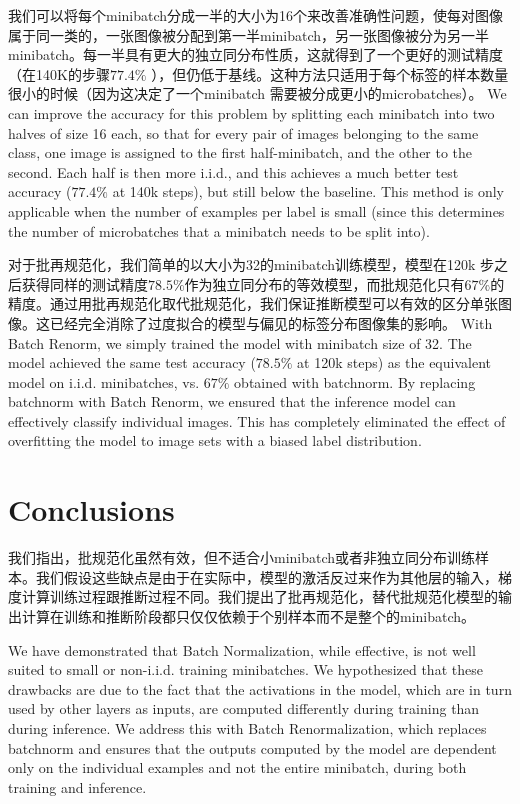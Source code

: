 我们可以将每个minibatch分成一半的大小为16个来改善准确性问题，使每对图像属于同一类的，一张图像被分配到第一半minibatch，另一张图像被分为另一半minibatch。每一半具有更大的独立同分布性质，这就得到了一个更好的测试精度（在140K的步骤$77.4\%$ ），但仍低于基线。这种方法只适用于每个标签的样本数量很小的时候（因为这决定了一个minibatch 需要被分成更小的microbatches）。
We can improve the accuracy for this problem by splitting each minibatch into two halves of size 16 each, so that for every pair of images belonging to the same class, one image is assigned to the first half-minibatch, and the other to the second. Each half is then more i.i.d., and this achieves a much better test accuracy ($77.4\%$ at 140k steps), but still below the baseline. This method is only applicable when the number of examples per label is small (since this determines the number of microbatches that a minibatch needs to be split into).

对于批再规范化，我们简单的以大小为32的minibatch训练模型，模型在120k 步之后获得同样的测试精度$78.5\%$作为独立同分布的等效模型，而批规范化只有$67\%$的精度。通过用批再规范化取代批规范化，我们保证推断模型可以有效的区分单张图像。这已经完全消除了过度拟合的模型与偏见的标签分布图像集的影响。
With Batch Renorm, we simply trained the model with minibatch size of 32. The model achieved the same test accuracy ($78.5\%$ at 120k steps) as the equivalent model on i.i.d. minibatches, vs. $67\%$ obtained with batchnorm. By replacing batchnorm with Batch Renorm, we ensured that the inference model can effectively classify individual images. This has completely eliminated the effect of overfitting the model to image sets with a biased label distribution.


\section{Conclusions}
我们指出，批规范化虽然有效，但不适合小minibatch或者非独立同分布训练样本。我们假设这些缺点是由于在实际中，模型的激活反过来作为其他层的输入，梯度计算训练过程跟推断过程不同。我们提出了批再规范化，替代批规范化模型的输出计算在训练和推断阶段都只仅仅依赖于个别样本而不是整个的minibatch。

We have demonstrated that Batch Normalization, while effective, is not well suited to small or non-i.i.d. training minibatches. We hypothesized that these drawbacks are due to the fact that the activations in the model, which are in turn used by other layers as inputs, are computed differently during training than during inference. We address this with Batch Renormalization, which replaces batchnorm and ensures that the outputs computed by the model are dependent only on the individual examples and not the entire minibatch, during both training and inference.

